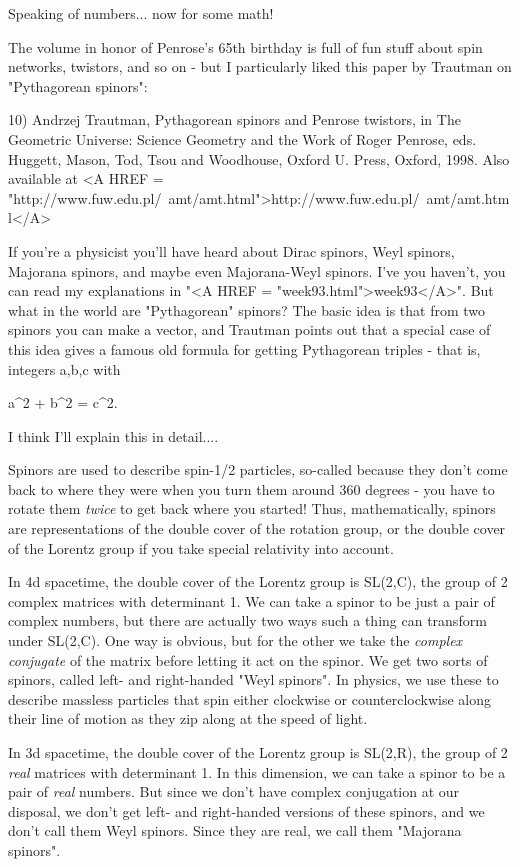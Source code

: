 Speaking of numbers... now for some math!

The volume in honor of Penrose's 65th birthday is full of fun stuff 
about spin networks, twistors, and so on - but I particularly liked 
this paper by Trautman on "Pythagorean spinors":

10) Andrzej Trautman, Pythagorean spinors and Penrose twistors, in 
The Geometric Universe: Science Geometry and the Work of Roger Penrose,
eds. Huggett, Mason, Tod, Tsou and Woodhouse, Oxford U. Press,
Oxford, 1998.  Also available at <A HREF = "http://www.fuw.edu.pl/~amt/amt.html">http://www.fuw.edu.pl/~amt/amt.html</A>

If you're a physicist you'll have heard about Dirac spinors, Weyl
spinors, Majorana spinors, and maybe even Majorana-Weyl spinors.  
I've you haven't, you can read my explanations in
"<A HREF = "week93.html">week93</A>".  But 
what in the world are "Pythagorean" spinors?  The basic idea is that 
from two spinors you can make a vector, and Trautman points out
that a special case of this idea gives a famous old formula for
getting Pythagorean triples - that is, integers a,b,c with

a^{2} + b^{2} = c^{2}.

I think I'll explain this in detail....

Spinors are used to describe spin-1/2 particles, so-called
because they don't come back to where they were when you 
turn them around 360 degrees - you have to rotate them \emph{twice} 
to get back where you started!  Thus, mathematically, spinors 
are representations of the double cover of the rotation group,
or the double cover of the Lorentz group if you take special 
relativity into account.  

In 4d spacetime, the double cover of the Lorentz group is 
SL(2,C), the group of 2 complex matrices with determinant 1.  
We can take a spinor to be just a pair of complex numbers, 
but there are actually two ways such a thing can transform 
under SL(2,C).  One way is obvious, but for the other we take 
the \emph{complex conjugate} of the matrix before letting it act 
on the spinor.  We get two sorts of spinors, called left- 
and right-handed "Weyl spinors".  In physics, we use these 
to describe massless particles that spin either clockwise or 
counterclockwise along their line of motion as they zip 
along at the speed of light.

In 3d spacetime, the double cover of the Lorentz group is SL(2,R),
the group of 2 \emph{real} matrices with determinant 1.  In this
dimension, we can take a spinor to be a pair of \emph{real} numbers.
But since we don't have complex conjugation at our disposal, we 
don't get left- and right-handed versions of these spinors, and
we don't call them Weyl spinors.  Since they are real, we call them
"Majorana spinors".

